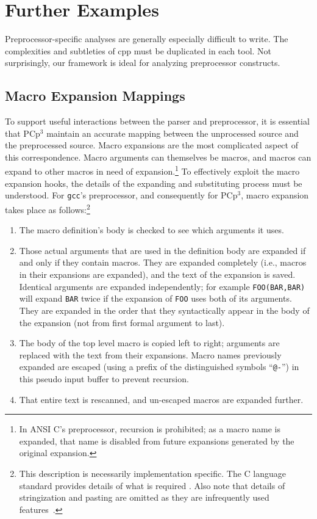 \documentclass{article}
\newcommand{\pcp}{\mbox{\textsf{PCp}$^3$}}
\newcommand{\Cpp}{\mbox{\textsf{cpp}}}
\newcommand{\C}{\mbox{C}}
\newcommand{\ie}{i.e.,}
\begin{document}

\section{Further Examples}
\label{sec:further_examples}

Preprocessor-specific analyses are generally especially difficult to
write.  The complexities and subtleties of \Cpp{} must be duplicated in
each tool.  Not surprisingly, our framework is ideal for analyzing
preprocessor constructs.

\subsection{Macro Expansion Mappings}
\label{ssec:macro_exp_map}
To support useful interactions between the parser and preprocessor, it
is essential that \pcp{} maintain an accurate mapping between the
unprocessed source and the preprocessed source.  Macro expansions are
the most complicated aspect of this correspondence.  Macro arguments can
themselves be macros, and macros can expand to other macros in need of
expansion.\footnote{In ANSI \C{}'s preprocessor, recursion is
  prohibited; as a macro name is expanded, that name is disabled from
  future expansions generated by the original expansion.}  To
effectively exploit the macro expansion hooks, the details of the
expanding and substituting process must be understood.  For
\texttt{gcc}'s preprocessor, and consequently for \pcp{}, macro
expansion takes place as follows:\footnote{This description is necessarily
  implementation specific.  The \C{} language standard provides details
of what is required \cite[Ch.~3]{Harbison91}.  Also note that
  details of stringization and pasting are omitted as they are
  infrequently used features~\cite{EmpCpp}.}

\begin{enumerate}
\item The macro definition's body is checked to see which arguments it uses.
\item Those actual arguments that are used in the definition body are
      expanded if and only if they contain macros.  They are expanded
      completely (\ie{} macros in their expansions are expanded), and
      the text of the expansion is saved.  Identical arguments are
      expanded independently; for example \texttt{FOO(BAR,BAR)} will
      expand \texttt{BAR} twice if the expansion of \texttt{FOO} uses
      both of its arguments.  They are expanded in the order that they
      syntactically appear in the body of the expansion (not from first formal
      argument to last).
\item The body of the top level macro is copied left to right; arguments
      are replaced with the text from their expansions.  Macro names
      previously expanded are escaped (using a prefix of the
      distinguished symbols ``\texttt{@-}'') in this pseudo input buffer
      to prevent recursion.
\item That entire text is rescanned, and un-escaped macros are expanded
      further.
\end{enumerate}
\end{document}
